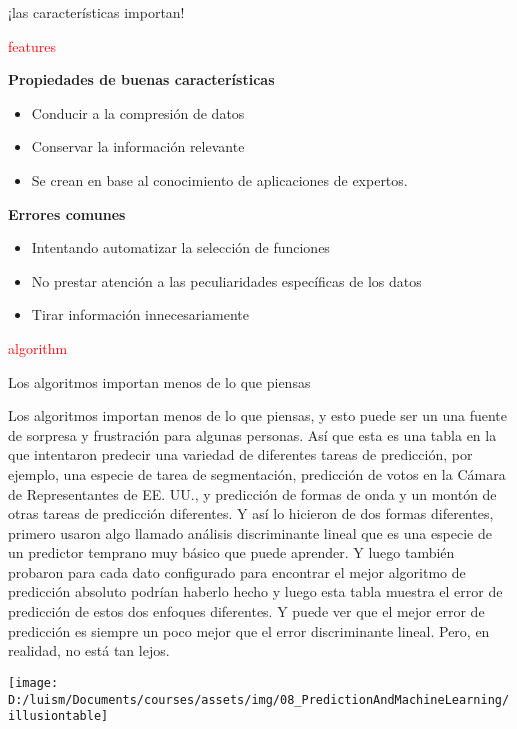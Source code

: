 \documentclass[
]{article}
\providecommand{\tightlist}{%
  \setlength{\itemsep}{0pt}\setlength{\parskip}{0pt}}
\begin{document}
¡las características importan!

\textcolor{red}{features}

\textbf{Propiedades de buenas características}

\begin{itemize}
\tightlist
\item
  Conducir a la compresión de datos
\item
  Conservar la información relevante
\item
  Se crean en base al conocimiento de aplicaciones de expertos.
\end{itemize}

\textbf{Errores comunes}

\begin{itemize}
\tightlist
\item
  Intentando automatizar la selección de funciones
\item
  No prestar atención a las peculiaridades específicas de los datos
\item
  Tirar información innecesariamente
\end{itemize}

\textcolor{red}{algorithm}

Los algoritmos importan menos de lo que piensas

Los algoritmos importan menos de lo que piensas, y esto puede ser un una
fuente de sorpresa y frustración para algunas personas. Así que esta es
una tabla en la que intentaron predecir una variedad de diferentes
tareas de predicción, por ejemplo, una especie de tarea de segmentación,
predicción de votos en la Cámara de Representantes de EE. UU., y
predicción de formas de onda y un montón de otras tareas de predicción
diferentes. Y así lo hicieron de dos formas diferentes, primero usaron
algo llamado análisis discriminante lineal que es una especie de un
predictor temprano muy básico que puede aprender. Y luego también
probaron para cada dato configurado para encontrar el mejor algoritmo de
predicción absoluto podrían haberlo hecho y luego esta tabla muestra el
error de predicción de estos dos enfoques diferentes. Y puede ver que el
mejor error de predicción es siempre un poco mejor que el error
discriminante lineal. Pero, en realidad, no está tan lejos.

\begin{center}\texttt{[image: D:/luism/Documents/courses/assets/img/08\_PredictionAndMachineLearning/illusiontable]} \end{center}
\end{document}
